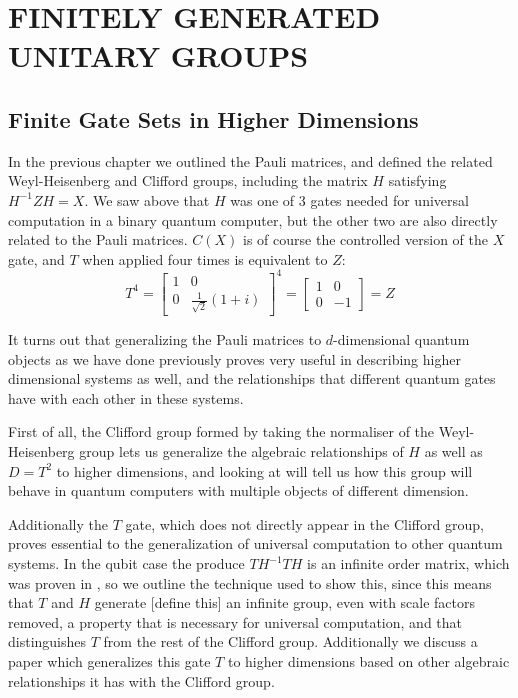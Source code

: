 
\chapter[FINITELY GENERATED UNITARY GROUPS]{FINITELY GENERATED UNITARY GROUPS}

\section{Finite Gate Sets in Higher Dimensions}
In the previous chapter we outlined the Pauli matrices, and defined the related Weyl-Heisenberg and Clifford groups, including the matrix $H$ satisfying $H^{-1}ZH = X$. We saw above that $H$ was one of 3 gates needed for universal computation in a binary quantum computer, but the other two are also directly related to the Pauli matrices. $C(X)$ is of course the controlled version of the $X$ gate, and $T$ when applied four times is equivalent to $Z$:
\[
T^4 = \left[\begin{matrix}
	1 & 0 \\
	0 & \frac{1}{\sqrt{2}}(1+i)
\end{matrix}\right]^4 = \left[\begin{matrix}
	1 & 0 \\
	0 & -1
\end{matrix}\right] = Z\]

It turns out that generalizing the Pauli matrices to $d$-dimensional quantum objects as we have done previously proves very useful in describing higher dimensional systems as well, and the relationships that different quantum gates have with each other in these systems.

First of all, the Clifford group formed by taking the normaliser of the Weyl-Heisenberg group lets us generalize the algebraic relationships of $H$ as well as $D = T^2$ to higher dimensions, and looking at \cite{tolar-clifford} will tell us how this group will behave in quantum computers with multiple objects of different dimension.

Additionally the $T$ gate, which does not directly appear in the Clifford group, proves essential to the generalization of universal computation to other quantum systems. In the qubit case the produce $TH^{-1}TH$ is an infinite order matrix, which was proven in \cite{pi-over-eight}, so we outline the technique used to show this, since this means that $T$ and $H$ generate [define this] an infinite group, even with scale factors removed, a property that is necessary for universal computation, and that distinguishes $T$ from the rest of the Clifford group. Additionally we discuss a paper \cite{pi-over-eight} which generalizes this gate $T$ to higher dimensions based on other algebraic relationships it has with the Clifford group.
